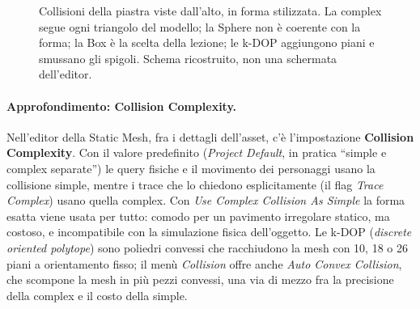 \begin{figure}[htbp]
\centering
{}
\caption{Collisioni della piastra viste dall'alto, in forma stilizzata. La complex
segue ogni triangolo del modello; la Sphere non è coerente con la forma; la Box è la
scelta della lezione; le k-DOP aggiungono piani e smussano gli spigoli. Schema
ricostruito, non una schermata dell'editor.}
\label{ue7:fig:kdop}
\end{figure}

\paragraph{Approfondimento: Collision Complexity.} Nell'editor della Static Mesh, fra
i dettagli dell'asset, c'è l'impostazione \textbf{Collision Complexity}. Con il
valore predefinito (\emph{Project Default}, in pratica ``simple e complex separate'') le
query fisiche e il movimento dei personaggi usano la collisione simple, mentre i trace
che lo chiedono esplicitamente (il flag \emph{Trace Complex}) usano quella complex. Con
\emph{Use Complex Collision As Simple} la forma esatta viene usata per tutto: comodo per
un pavimento irregolare statico, ma costoso, e incompatibile con la simulazione fisica
dell'oggetto. Le k-DOP (\emph{discrete oriented polytope}) sono poliedri convessi che
racchiudono la mesh con 10, 18 o 26 piani a orientamento fisso; il menù
\emph{Collision} offre anche \emph{Auto Convex Collision}, che scompone la mesh in più
pezzi convessi, una via di mezzo fra la precisione della complex e il costo della
simple.

